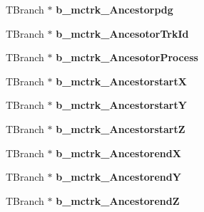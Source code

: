 \begin{DoxyCompactItemize}
\item 
\hypertarget{classanatree_a271d9def38eb5147fbb90be70682807e}{T\-Branch $\ast$ {\bfseries b\-\_\-mctrk\-\_\-\-Ancestorpdg}}\label{classanatree_a271d9def38eb5147fbb90be70682807e}

\item 
\hypertarget{classanatree_aee383667019cc03b87dc4e2030187729}{T\-Branch $\ast$ {\bfseries b\-\_\-mctrk\-\_\-\-Ancesotor\-Trk\-Id}}\label{classanatree_aee383667019cc03b87dc4e2030187729}

\item 
\hypertarget{classanatree_aa0163563c346977d0478cc38d8a51bd9}{T\-Branch $\ast$ {\bfseries b\-\_\-mctrk\-\_\-\-Ancesotor\-Process}}\label{classanatree_aa0163563c346977d0478cc38d8a51bd9}

\item 
\hypertarget{classanatree_a1d39a5922011b7c83ff212a77236ce74}{T\-Branch $\ast$ {\bfseries b\-\_\-mctrk\-\_\-\-Ancestorstart\-X}}\label{classanatree_a1d39a5922011b7c83ff212a77236ce74}

\item 
\hypertarget{classanatree_a9b0d2582cbdef9582e1f2fa52cf115df}{T\-Branch $\ast$ {\bfseries b\-\_\-mctrk\-\_\-\-Ancestorstart\-Y}}\label{classanatree_a9b0d2582cbdef9582e1f2fa52cf115df}

\item 
\hypertarget{classanatree_a6f4f0853ab8b8cae4c80592afbbb7a2b}{T\-Branch $\ast$ {\bfseries b\-\_\-mctrk\-\_\-\-Ancestorstart\-Z}}\label{classanatree_a6f4f0853ab8b8cae4c80592afbbb7a2b}

\item 
\hypertarget{classanatree_a30fb9f5412c339863697275b5fc41e6e}{T\-Branch $\ast$ {\bfseries b\-\_\-mctrk\-\_\-\-Ancestorend\-X}}\label{classanatree_a30fb9f5412c339863697275b5fc41e6e}

\item 
\hypertarget{classanatree_a0d433a7e6f6dfd3a4c7f51c338d72947}{T\-Branch $\ast$ {\bfseries b\-\_\-mctrk\-\_\-\-Ancestorend\-Y}}\label{classanatree_a0d433a7e6f6dfd3a4c7f51c338d72947}

\item 
\hypertarget{classanatree_a31b2c0a23a994efcd2e70d4f75a528b7}{T\-Branch $\ast$ {\bfseries b\-\_\-mctrk\-\_\-\-Ancestorend\-Z}}\label{classanatree_a31b2c0a23a994efcd2e70d4f75a528b7}

\end{DoxyCompactItemize}


